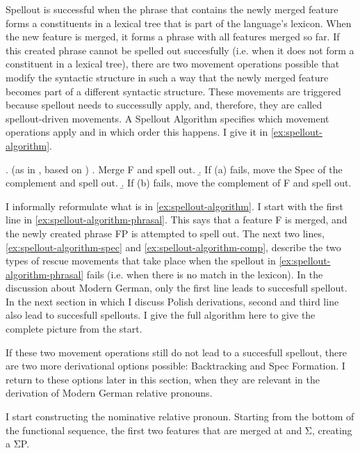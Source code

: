 Spellout is successful when the phrase that contains the newly merged feature forms a constituents in a lexical tree that is part of the language's lexicon.
When the new feature is merged, it forms a phrase with all features merged so far.
If this created phrase cannot be spelled out succesfully (i.e. when it does not form a constituent in a lexical tree), there are two movement operations possible that modify the syntactic structure in such a way that the newly merged feature becomes part of a different syntactic structure.
These movements are triggered because spellout needs to successully apply, and, therefore, they are called spellout-driven movements.
A Spellout Algorithm specifies which movement operations apply and in which order this happens. I give it in \ref{ex:spellout-algorithm}.

\ex.  (as in \citealt{caha2020a}, based on \citealt{starke2018})\label{ex:spellout-algorithm}
 \a. Merge F and spell out.\label{ex:spellout-algorithm-phrasal}
 \b. If (a) fails, move the Spec of the complement and spell out.\label{ex:spellout-algorithm-spec}
 \b. If (b) fails, move the complement of F and spell out.\label{ex:spellout-algorithm-comp}

I informally reformulate what is in \ref{ex:spellout-algorithm}. I start with the first line in \ref{ex:spellout-algorithm-phrasal}. This says that a feature F is merged, and the newly created phrase FP is attempted to spell out.
The next two lines, \ref{ex:spellout-algorithm-spec} and \ref{ex:spellout-algorithm-comp}, describe the two types of rescue movements that take place when the spellout in \ref{ex:spellout-algorithm-phrasal} fails (i.e. when there is no match in the lexicon).
In the discussion about Modern German, only the first line leads to succesfull spellout. In the next section in which I discuss Polish derivations, second and third line also lead to succesfull spellouts. I give the full algorithm here to give the complete picture from the start.

If these two movement operations still do not lead to a succesfull spellout, there are two more derivational options possible: Backtracking and Spec Formation. I return to these options later in this section, when they are relevant in the derivation of Modern German relative pronouns.

I start constructing the nominative relative pronoun. Starting from the bottom of the functional sequence, the first two features that are merged at  and Σ, creating a ΣP.

